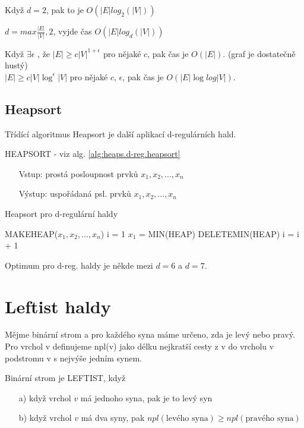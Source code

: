 Když $d = 2$, pak to je $O(|E|log_2(|V|))$
\par
$d = max {\frac{|E|}{|V|}, 2}$, vyjde čas $O(|E|log_d(|V|))$ 
\par
Když $\exists \epsilon$ , že $|E| \geq c|V|^{1+\epsilon}$ pro nějaké $c$,
pak čas je $O(|E|)$. (graf je dostatečně hustý) \\
$|E| \geq c|V|\log^{\epsilon} |V|$ pro nějaké $c$, $\epsilon$, pak čas je
$O(|E|\log log |V|)$.
\par


\subsection{Heapsort}

Třídící algoritmus Heapsort je další aplikací d-regulárních hald.

HEAPSORT - viz alg. \ref{alg:heaps.d-reg.heapsort} 

\begin{itemize}
\item[Vstup:] prostá posloupnost prvků $x_1, x_2, ..., x_n$
\item[Výstup:] uspořádaná psl. prvků $x_1, x_2, ..., x_n$
\end{itemize}

\begin{algorithm}[!htb]
\caption{Heapsort pro d-regulární haldy}
\label{alg:heaps.d-reg.heapsort}
\begin{algorithmic}
\STATE MAKEHEAP($x_1, x_2, ..., x_n$)
  \STATE i = 1
    \STATE $x_1$ = MIN(HEAP)
    \STATE DELETEMIN(HEAP)
    \STATE i = i + 1
  \ENDWHILE
\end{algorithmic}
\end{algorithm}

\begin{pozn}
Optimum pro d-reg. haldy je někde mezi $d=6$ a $d=7$.
\end{pozn}

\section{Leftist haldy}

\begin{defn}
Mějme binární strom a pro každého syna máme určeno, zda je levý nebo
pravý. Pro vrchol v definujeme npl(v) jako délku nejkratší cesty z v do
vrcholu v podstromu v s nejvýše jedním synem. 

Binární strom je LEFTIST, když 
\begin{itemize}
\item[a)] když vrchol $v$ má jednoho syna, pak je to levý syn
\item[b)] když vrchol $v$ má dva syny, pak 
	$npl(\text{levého syna}) \geq npl(\text{pravého syna})$
\end{itemize}
\end{defn}

